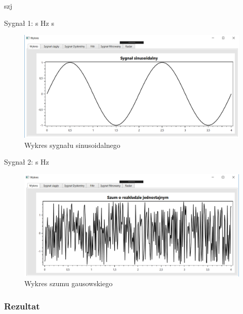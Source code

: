 \documentclass[12pt]{article}
\begin{document}
\begin{labeling}{szj}
\item [Sygnał 1:]
 s
 Hz
 s

\begin{figure}[h!]
 \centering
 \includegraphics[width=12.3cm]{sin.PNG}
 \vspace{-0.3cm}
 \caption{Wykres sygnału sinusoidalnego}
 \label{sin}
\end{figure}

\item [Sygnał 2:]
 s
 Hz

\end{labeling}

\begin{figure}[h!]
 \centering
 \includegraphics[width=12.3cm]{szum.PNG}
 \vspace{-0.3cm}
 \caption{Wykres szumu gausowskiego}
 \label{szum}
\end{figure}
 \newpage
\subsubsection{Rezultat}
\end{document}
